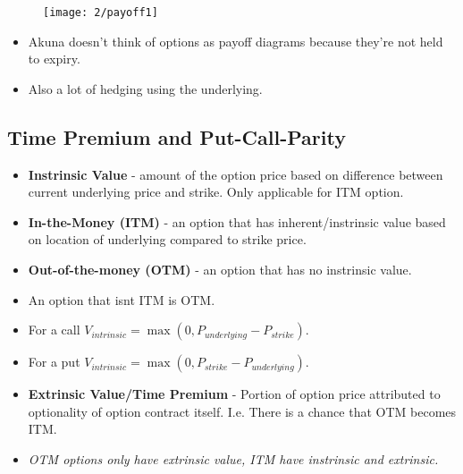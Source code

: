 \documentclass{article}
\begin{document}
\begin{figure}[h]
    \texttt{[image: 2/payoff1]}
    \centering
\end{figure}

\begin{itemize}
    \item Akuna doesn't think of options as payoff diagrams because they're not
    held to expiry.
    \item Also a lot of hedging using the underlying.
\end{itemize}

\subsection{Time Premium and Put-Call-Parity}
\begin{itemize}
    \item \textbf{Instrinsic Value} - amount of the option price based on
    difference between current underlying price and strike. Only applicable for
    ITM option.
    \item \textbf{In-the-Money (ITM)} - an option that has inherent/instrinsic
    value based on location of underlying compared to strike price.
    \item \textbf{Out-of-the-money (OTM)} - an option that has no instrinsic
    value.
    \item An option that isnt ITM is OTM.
    \item For a call $V_{intrinsic} = \max(0, P_{underlying} - P_{strike})$.
    \item For a put $V_{intrinsic} = \max(0, P_{strike} - P_{underlying})$.
    \item \textbf{Extrinsic Value/Time Premium} - Portion of option price 
    attributed to optionality of option contract itself. I.e. There is a chance
    that OTM becomes ITM.
    \item \textit{OTM options only have extrinsic value, ITM have instrinsic and
    extrinsic.}
\end{itemize}
\end{document}
